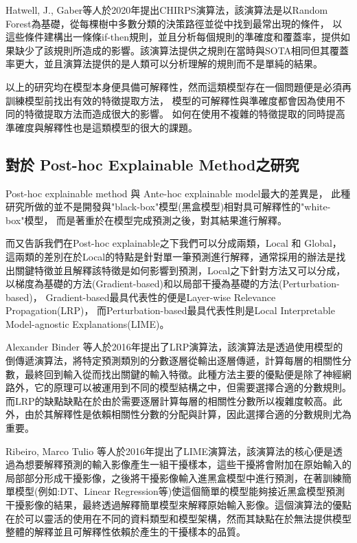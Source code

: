 \documentclass[class=NCU_thesis, crop=false]{standalone}
\begin{document}
Hatwell, J., Gaber等人於2020年提出CHIRPS演算法\cite{hatwell2020chirps}，該演算法是以Random Forest為基礎，從每棵樹中多數分類的決策路徑並從中找到最常出現的條件，
以這些條件建構出一條條if-then規則，並且分析每個規則的準確度和覆蓋率，提供如果缺少了該規則所造成的影響。該演算法提供之規則在當時與SOTA相同但其覆蓋率更大，並且演算法提供的是人類可以分析理解的規則而不是單純的結果。

以上的研究均在模型本身便具備可解釋性，然而這類模型存在一個問題便是必須再訓練模型前找出有效的特徵提取方法，
模型的可解釋性與準確度都會因為使用不同的特徵提取方法而造成很大的影響。
如何在使用不複雜的特徵提取的同時提高準確度與解釋性也是這類模型的很大的課題。

\subsection{對於 Post-hoc Explainable Method之研究}
Post-hoc explainable method 與 Ante-hoc explainable model最大的差異是，
此種研究所做的並不是開發與"black-box"模型(黑盒模型)相對具可解釋性的"white-box"模型，
而是著重於在模型完成預測之後，對其結果進行解釋。

而\cite{Nielsen_2022}又告訴我們在Post-hoc explainable之下我們可以分成兩類，Local 和 Global，
這兩類的差別在於Local的特點是針對單一筆預測進行解釋，通常採用的辦法是找出關鍵特徵並且解釋該特徵是如何影響到預測，Local之下針對方法又可以分成，以梯度為基礎的方法(Gradient-based)和以局部干擾為基礎的方法(Perturbation-based)，
Gradient-based最具代表性的便是Layer-wise Relevance Propagation(LRP)\cite{10.1007/978-3-319-44781-0_8}，
而Perturbation-based最具代表性則是Local Interpretable Model-agnostic Explanations(LIME)\cite{10.1145/2939672.2939778}。

Alexander Binder 等人於2016年提出了LRP演算法\cite{10.1007/978-3-319-44781-0_8}，該演算法是透過使用模型的倒傳遞演算法，將特定預測類別的分數逐層從輸出逐層傳遞，計算每層的相關性分數，最終回到輸入從而找出關鍵的輸入特徵。此種方法主要的優點便是除了神經網路外，它的原理可以被運用到不同的模型結構之中，但需要選擇合適的分數規則。而LRP的缺點缺點在於由於需要逐層計算每層的相關性分數所以複雜度較高。此外，由於其解釋性是依賴相關性分數的分配與計算，因此選擇合適的分數規則尤為重要。

Ribeiro, Marco Tulio 等人於2016年提出了LIME演算法\cite{10.1145/2939672.2939778}，該演算法的核心便是透過為想要解釋預測的輸入影像產生一組干擾樣本，這些干擾將會附加在原始輸入的局部部分形成干擾影像，之後將干擾影像輸入進黑盒模型中進行預測，在著訓練簡單模型(例如:DT、Linear Regression等)使這個簡單的模型能夠接近黑盒模型預測干擾影像的結果，最終透過解釋簡單模型來解釋原始輸入影像。這個演算法的優點在於可以靈活的使用在不同的資料類型和模型架構，然而其缺點在於無法提供模型整體的解釋並且可解釋性依賴於產生的干擾樣本的品質。
\end{document}
